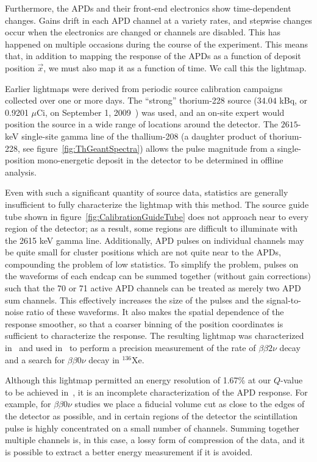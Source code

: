 Furthermore, the APDs and their front-end electronics show time-dependent changes. Gains drift in each APD channel at a variety rates, and stepwise changes occur when the electronics are changed or channels are disabled. This has happened on multiple occasions during the course of the experiment.  This means that, in addition to mapping the response of the APDs as a function of deposit position $\vec{x}$, we must also map it as a function of  time. We call this the lightmap.

Earlier lightmaps were derived from periodic source calibration campaigns collected over one or more days. The ``strong'' thorium-228 source ($34.04$ kBq, or 0.9201 $\mu$Ci, on September 1, 2009~\cite{SourceCertificates}) was used, and an on-site expert would  position the source in a wide range of locations around the detector.  The $2615$-keV single-site gamma line of the thallium-208 (a daughter product of thorium-228, see figure~\ref{fig:ThGeantSpectra}) allows the pulse magnitude from a single-position mono-energetic deposit in the detector to be determined in offline analysis.

Even with such a significant quantity of source data, statistics are generally insufficient to fully characterize the lightmap with this method.  The source guide tube shown in figure~\ref{fig:CalibrationGuideTube} does not approach near to every region of the detector; as a result, some regions are difficult to illuminate with the 2615 keV gamma line.  Additionally, APD pulses on individual channels may be quite small for cluster positions which are not quite near to the APDs, compounding the problem of low statistics.  To simplify the problem, pulses on the waveforms of each endcap can be summed together (without gain corrections) such that the 70 or 71 active APD channels can be treated as merely two APD sum channels.  This effectively increases the size of the pulses and the signal-to-noise ratio of these waveforms. It also makes the spatial dependence of the response smoother, so that a coarser binning of the position coordinates is sufficient to characterize the response.  The resulting lightmap was characterized in~\cite{ThesisSteve} and used in~\cite{bb0nSearch2012,bb2nEXO2014} to perform a precision measurement of the rate of $\beta\beta 2\nu$ decay and a search for $\beta\beta 0\nu$ decay in $^{136}$Xe.

Although this lightmap permitted an energy resolution of 1.67\% at our $Q$-value to be achieved in~\cite{bb0nSearch2012}, it is an incomplete characterization of the APD response.  For example, for $\beta\beta0\nu$ studies we place a fiducial volume cut as close to the edges of the detector as possible, and in certain regions of the detector the scintillation pulse is highly concentrated on a small number of channels.  Summing together multiple channels is, in this case, a lossy form of compression of the data, and it is possible to extract a better energy measurement if it is avoided.

